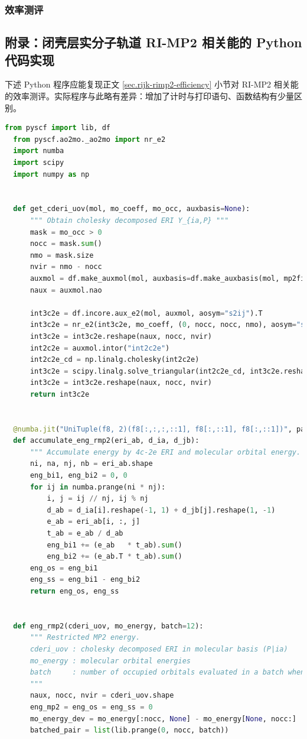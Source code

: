 \subsubsection{效率测评}

\newpage

\subsection{附录：闭壳层实分子轨道 RI-MP2 相关能的 Python 代码实现}
\label{sec.python-ri-mp2}

下述 Python 程序应能复现正文 \ref{sec.rijk-rimp2-efficiency} 小节对 RI-MP2 相关能的效率测评。实际程序与此略有差异：增加了计时与打印语句、函数结构有少量区别。

\begin{lstlisting}[language=Python]
  from pyscf import lib, df
  from pyscf.ao2mo._ao2mo import nr_e2
  import numba
  import scipy
  import numpy as np
  
  
  def get_cderi_uov(mol, mo_coeff, mo_occ, auxbasis=None):
      """ Obtain cholesky decomposed ERI Y_{ia,P} """
      mask = mo_occ > 0
      nocc = mask.sum()
      nmo = mask.size
      nvir = nmo - nocc
      auxmol = df.make_auxmol(mol, auxbasis=df.make_auxbasis(mol, mp2fit=True)).build()
      naux = auxmol.nao
      
      int3c2e = df.incore.aux_e2(mol, auxmol, aosym="s2ij").T
      int3c2e = nr_e2(int3c2e, mo_coeff, (0, nocc, nocc, nmo), aosym="s2", mosym="s1")
      int3c2e = int3c2e.reshape(naux, nocc, nvir)
      int2c2e = auxmol.intor("int2c2e")
      int2c2e_cd = np.linalg.cholesky(int2c2e)
      int3c2e = scipy.linalg.solve_triangular(int2c2e_cd, int3c2e.reshape(naux, -1), lower=True)
      int3c2e = int3c2e.reshape(naux, nocc, nvir)
      return int3c2e
  
  
  @numba.jit("UniTuple(f8, 2)(f8[:,:,:,::1], f8[:,::1], f8[:,::1])", parallel=True, nopython=True)
  def accumulate_eng_rmp2(eri_ab, d_ia, d_jb):
      """ Accumulate energy by 4c-2e ERI and molecular orbital energy. """
      ni, na, nj, nb = eri_ab.shape
      eng_bi1, eng_bi2 = 0, 0
      for ij in numba.prange(ni * nj):
          i, j = ij // nj, ij % nj
          d_ab = d_ia[i].reshape(-1, 1) + d_jb[j].reshape(1, -1)
          e_ab = eri_ab[i, :, j]
          t_ab = e_ab / d_ab
          eng_bi1 += (e_ab   * t_ab).sum()
          eng_bi2 += (e_ab.T * t_ab).sum()
      eng_os = eng_bi1
      eng_ss = eng_bi1 - eng_bi2
      return eng_os, eng_ss
  
  
  def eng_rmp2(cderi_uov, mo_energy, batch=12):
      """ Restricted MP2 energy.
      cderi_uov : cholesky decomposed ERI in molecular basis (P|ia)
      mo_energy : molecular orbital energies
      batch     : number of occupied orbitals evaluated in a batch when energy accumulation
      """
      naux, nocc, nvir = cderi_uov.shape
      eng_mp2 = eng_os = eng_ss = 0
      mo_energy_dev = mo_energy[:nocc, None] - mo_energy[None, nocc:]
      batched_pair = list(lib.prange(0, nocc, batch))
      

\end{lstlisting}
